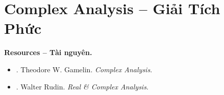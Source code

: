 \documentclass{article}
\begin{document}

\section{Complex Analysis -- Giải Tích Phức}
\textbf{\textsf{Resources -- Tài nguyên.}}
\begin{itemize}
	\item \cite{Gamelin2001}. {\sc Theodore W. Gamelin}. {\it Complex Analysis}.
	
	\item \cite{Rudin1987}. {\sc Walter Rudin}. {\it Real \& Complex Analysis}.
\end{itemize}

\end{document}
